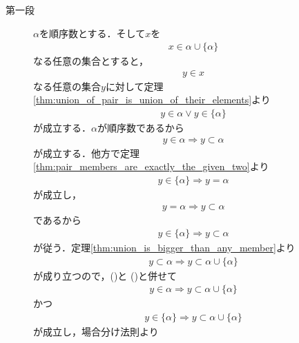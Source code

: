	\begin{sketch}\mbox{}
		\begin{description}
			\item[第一段]
				$\alpha$を順序数とする．そして$x$を
				\begin{align}
					x \in \alpha \cup \{\alpha\}
					\label{fom:thm_latter_element_is_ordinal_3}
				\end{align}
				なる任意の集合とすると，
				\begin{align}
					y \in x
				\end{align}
				なる任意の集合$y$に対して定理\ref{thm:union_of_pair_is_union_of_their_elements}より
				\begin{align}
					y \in \alpha \vee y \in \{\alpha\}
					\label{fom:thm_latter_element_is_ordinal_5}
				\end{align}
				が成立する．$\alpha$が順序数であるから
				\begin{align}
					y \in \alpha \Longrightarrow y \subset \alpha
					\label{fom:thm_latter_element_is_ordinal_1}
				\end{align}
				が成立する．他方で定理\ref{thm:pair_members_are_exactly_the_given_two}より
				\begin{align}
					y \in \{\alpha\} \Longrightarrow y = \alpha
				\end{align}
				が成立し，
				\begin{align}
					y = \alpha \Longrightarrow y \subset \alpha
				\end{align}
				であるから
				\begin{align}
					y \in \{\alpha\} \Longrightarrow y \subset \alpha
					\label{fom:thm_latter_element_is_ordinal_2}
				\end{align}
				が従う．定理\ref{thm:union_is_bigger_than_any_member}より
				\begin{align}
					y \subset \alpha \Longrightarrow y \subset \alpha \cup \{\alpha\}
				\end{align}
				が成り立つので，()と
				()と併せて
				\begin{align}
					y \in \alpha \Longrightarrow y \subset \alpha \cup \{\alpha\}
				\end{align}
				かつ
				\begin{align}
					y \in \{\alpha\} \Longrightarrow y \subset \alpha \cup \{\alpha\}
				\end{align}
				が成立し，場合分け法則より
				\begin{align}

\end{align}
\end{description}
\end{sketch}
